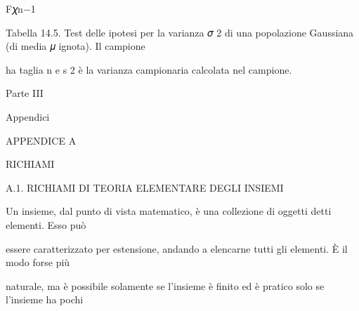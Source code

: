 \documentclass[a4paper,portrait,12pt]{article}
\begin{document}
\begin{flushleft}
F𝜒n$-$1
\end{flushleft}





\begin{flushleft}
Tabella 14.5. Test delle ipotesi per la varianza 𝜎 2 di una popolazione Gaussiana (di media 𝜇 ignota). Il campione
\end{flushleft}


\begin{flushleft}
ha taglia n e s 2 \`{e} la varianza campionaria calcolata nel campione.
\end{flushleft}





\begin{flushleft}
\newpage
\newpage
Parte III
\end{flushleft}


\begin{flushleft}
Appendici
\end{flushleft}





\begin{flushleft}
\newpage
\newpage
APPENDICE A
\end{flushleft}


\begin{flushleft}
RICHIAMI
\end{flushleft}


\begin{flushleft}
A.1. RICHIAMI DI TEORIA ELEMENTARE DEGLI INSIEMI
\end{flushleft}


\begin{flushleft}
Un insieme, dal punto di vista matematico, \`{e} una collezione di oggetti detti elementi. Esso pu\`{o}
\end{flushleft}


\begin{flushleft}
essere caratterizzato per estensione, andando a elencarne tutti gli elementi. \`{E} il modo forse più
\end{flushleft}


\begin{flushleft}
naturale, ma \`{e} possibile solamente se l'insieme \`{e} finito ed \`{e} pratico solo se l'insieme ha pochi
\end{flushleft}
\end{document}
